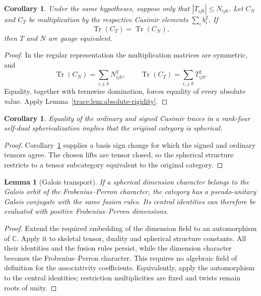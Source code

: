 \documentclass[11pt,a4paper]{article}
\newtheorem{lemma}[theorem]{Lemma}
\newtheorem{corollary}[theorem]{Corollary}
\theoremstyle{definition}\newtheorem{definition}[theorem]{Definition}
\theoremstyle{remark}\newtheorem{remark}[theorem]{Remark}
\newcommand{\CC}{\mathbb C}
\numberwithin{equation}{section}
\begin{document}
\begin{corollary}\label{trace:cor:trace-rigidity}
Under the same hypotheses, suppose only that $|T_{ijk}|\le N_{ijk}$. Let $C_N$ and $C_T$ be multiplication by the respective Casimir elements $\sum_i b_i^2$. If
\[
\operatorname{Tr}(C_T)=\operatorname{Tr}(C_N),
\]
then $T$ and $N$ are gauge equivalent.
\end{corollary}
\begin{proof}
In the regular representation the multiplication matrices are symmetric, and
\[
\operatorname{Tr}(C_N)=\sum_{i,j,k}N_{ijk}^2,
\qquad
\operatorname{Tr}(C_T)=\sum_{i,j,k}T_{ijk}^2.
\]
Equality, together with termwise domination, forces equality of every absolute value. Apply Lemma~\ref{trace:lem:absolute-rigidity}.
\end{proof}

\begin{corollary}\label{core:trace-spherical}
Equality of the ordinary and signed Casimir traces in a rank-four
self-dual sphericalization implies that the original category is spherical.
\end{corollary}
\begin{proof}
Corollary~\ref{trace:cor:trace-rigidity} supplies a basis sign change
for which the signed and ordinary tensors agree. The chosen lifts
are tensor closed, so the spherical structure restricts to a tensor
subcategory equivalent to the original category.
\end{proof}

\begin{lemma}[Galois transport]\label{core:lem:galois-transport}
If a spherical dimension character belongs to the Galois orbit of the
Frobenius--Perron character, the category has a pseudo-unitary Galois
conjugate with the same fusion rules. Its central identities can
therefore be evaluated with positive Frobenius--Perron dimensions.
\end{lemma}
\begin{proof}
Extend the required embedding of the dimension field to an automorphism
of $\CC$. Apply it to skeletal tensor, duality and spherical
structure constants. All their identities and the fusion rules persist,
while the dimension character becomes the Frobenius--Perron character.
This requires no algebraic field of definition for the associativity
coefficients. Equivalently, apply the automorphism to the central
identities; restriction multiplicities are fixed and twists remain
roots of unity.
\end{proof}
\end{document}
